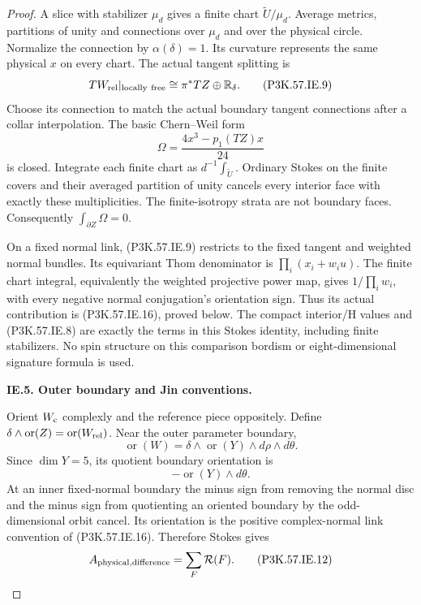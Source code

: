 \begin{proof}
A slice with stabilizer \(\mu_d\) gives a
finite chart \(\widetilde U/\mu_d\). Average
metrics, partitions of unity and connections
over \(\mu_d\) and over the physical circle.
Normalize the connection by
\(\alpha(\delta)=1\). Its curvature represents
the same physical \(x\) on every chart. The
actual tangent splitting is
\[
 TW_{\rm rel}|_{\rm locally\ free}
                    \cong\pi^*TZ\oplus\mathbb R_\delta .      \tag{P3K.57.IE.9}
\]
Choose its connection to match the actual
boundary tangent connections after a collar
interpolation. The basic Chern--Weil form
\[
                      \Omega=\frac{4x^3-p_1(TZ)x}{24}         \tag{P3K.57.IE.10}
\]
is closed. Integrate each finite chart as
\(d^{-1}\int_{\widetilde U}\). Ordinary Stokes
on the finite covers and their averaged
partition of unity cancels every interior
face with exactly these multiplicities.
The finite-isotropy strata are not boundary
faces. Consequently
\(\int_{\partial Z}\Omega=0\).

On a fixed normal link, (P3K.57.IE.9) restricts
to the fixed tangent and weighted normal
bundles. Its equivariant Thom denominator
is \(\prod_i(x_i+w_i u)\). The finite
chart integral, equivalently the weighted
projective power map, gives
\(1/\prod_iw_i\), with every negative
normal conjugation's orientation sign.
Thus its actual contribution is (P3K.57.IE.16), proved below.
The compact interior/H values and (P3K.57.IE.8)
are exactly the terms in this Stokes
identity, including finite stabilizers.
No spin structure on this comparison
bordism or eight-dimensional signature
formula is used.

\par\medskip\noindent\textbf{IE.5. Outer boundary and Jin conventions.}\par\nopagebreak[4]

Orient \(W_{\rm c}\) complexly and the
reference piece oppositely. Define
\(\delta\wedge\operatorname{or}(Z)
=\operatorname{or}(W_{\rm rel})\).
Near the outer parameter boundary,
\[
 \operatorname{or}(W)
 =\delta\wedge\operatorname{or}(Y)
                  \wedge d\rho\wedge d\theta .
\]
Since \(\dim Y=5\), its quotient boundary
orientation is
\[
                         -\operatorname{or}(Y)\wedge d\theta.       \tag{P3K.57.IE.11}
\]
At an inner fixed-normal boundary the
minus sign from removing the normal disc
and the minus sign from quotienting an
oriented boundary by the odd-dimensional
orbit cancel. Its orientation is the
positive complex-normal link convention
of (P3K.57.IE.16). Therefore Stokes gives
\[
                 A_{\rm physical,difference}
                          =\sum_F\mathcal R(F).          \tag{P3K.57.IE.12}
\]


\end{proof}
